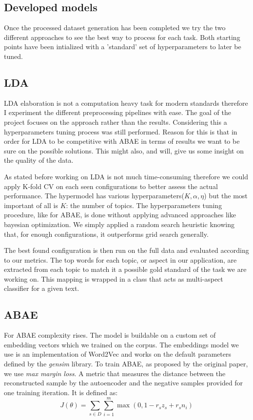 \subsection{Developed models}
Once the processed dataset generation has been completed we try the two different approaches to see the best way
to process for each task. Both starting points have been intialized with a 'standard' set of hyperparameters
to later be tuned.

\subsection{LDA}
LDA elaboration is not a computation heavy task for modern standards therefore I experiment the different
preprocessing pipelines with ease.
The goal of the project focuses on the approach rather than the results.
Considering this a hyperparameters tuning process was still performed.
Reason for this is that in order for LDA to be competitive with ABAE in terms of results we want
to be sure on the possible solutions. This might also, and will, give us some insight on the quality of the data.

As stated before working on LDA is not much time-consuming therefore we could apply K-fold CV on each
seen configurations to better assess the actual performance.
The hypermodel has various hyperparameters($K,\alpha, \eta$) but the most important of all is $K$: the number of topics.
The hyperparameters tuning procedure, like for ABAE, is done without applying advanced approaches like bayesian optimization.
We simply applied a random search heuristic knowing that, for enough configurations, it outperforms grid search generally.

The best found configuration is then run on the full data and evaluated according to our metrics.
The top words for each topic, or aspect in our application, are extracted from each topic to match it a possible gold standard of the task we are working on.
This mapping is wrapped in a class that acts as multi-aspect classifier for a given text.

\subsection{ABAE}
For ABAE complexity rises.
The model is buildable on a custom set of embedding vectors which we trained on the corpus.
The embeddings model we use is an implementation of Word2Vec and works on the default parameters defined by the \textit{gensim} library.
To train ABAE, as proposed by the original paper, we use \textit{max margin loss}.
A metric that measures the distance between the reconstructed sample by the autoencoder and the negative samples
provided for one training iteration. It is defined as:
$$ J(\theta) = \sum_{s\in D}\sum_{i=1}^m \max(0, 1 - r_sz_s + r_sn_i)$$

